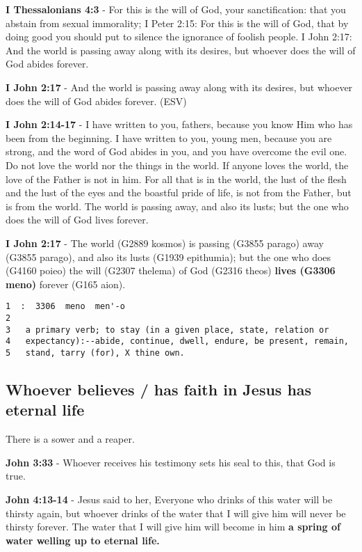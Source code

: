 \documentclass[11pt]{article}
\begin{document}
\textbf{I Thessalonians 4:3} - For this is the will of God, your sanctification: that you abstain from sexual immorality;
I Peter 2:15: For this is the will of God, that by doing good you should put to silence the ignorance of foolish people.
I John 2:17: And the world is passing away along with its desires, but whoever does the will of God abides forever.

\textbf{I John 2:17} - And the world is passing away along with its desires, but whoever does the will of God abides forever. (ESV)

\textbf{I John 2:14-17} - I have written to you, fathers, because you know Him who has been from the beginning. I have written to you, young men, because you are strong, and the word of God abides in you, and you have overcome the evil one.  Do not love the world nor the things in the world. If anyone loves the world, the love of the Father is not in him.  For all that is in the world, the lust of the flesh and the lust of the eyes and the boastful pride of life, is not from the Father, but is from the world.  The world is passing away, and also its lusts; but the one who does the will of God lives forever.

\textbf{I John 2:17} - The world (G2889 kosmos) is passing (G3855 parago) away (G3855 parago), and also its lusts (G1939 epithumia); but the one who does (G4160 poieo) the will (G2307 thelema) of God (G2316 theos) \textbf{lives (G3306 meno)} forever (G165 aion).

\begin{verbatim}
1  :  3306  meno  men'-o
2  
3   a primary verb; to stay (in a given place, state, relation or
4   expectancy):--abide, continue, dwell, endure, be present, remain,
5   stand, tarry (for), X thine own.
\end{verbatim}

\subsection{Whoever believes / has faith in Jesus has eternal life}
\label{sec:orgcf3371a}
There is a sower and a reaper.

\textbf{John 3:33} - Whoever receives his testimony sets his seal to this, that God is true.

\textbf{John 4:13-14} - Jesus said to her, Everyone who drinks of this water will be thirsty again, but whoever drinks of the water that I will give him will never be thirsty forever. The water that I will give him will become in him \textbf{a spring of water welling up to eternal life.}
\end{document}
